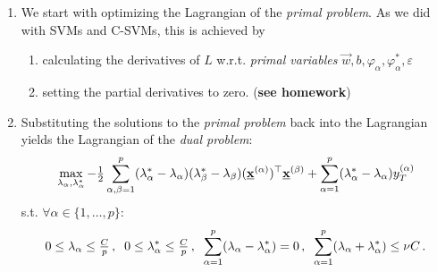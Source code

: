 \begin{frame}\frametitle{\subsecname}

\begin{enumerate}
\item We start with optimizing the Lagrangian of the \emph{primal problem}. As we did with SVMs and C-SVMs, this is achieved by
\begin{enumerate}
\item calculating the derivatives of $L$ w.r.t. \emph{primal variables} $\vec w, b, \varphi_\alpha, \varphi_\alpha^*, \varepsilon$
\item setting the partial derivatives to zero. (\textbf{see homework})
\end{enumerate}

\item Substituting the solutions to the \emph{primal problem} back into the Lagrangian yields the Lagrangian of the \emph{dual problem}:
		\begin{equation}
		  \max_{\lambda_{\alpha}, \lambda_{\alpha}^*}
		  - {\textstyle \frac{1}{2}}\sum_{\alpha,\beta=1}^p(\lambda_{\alpha}^* -
		  \lambda_{\alpha}) (\lambda_{\beta}^* - \lambda_{\beta})
		  (\underline{\mathbf{x}}^{(\alpha)})^\top\underline{\mathbf{x}}^{(\beta)} +
		  \sum_{\alpha=1}^p(\lambda_{\alpha}^* 
		  - \lambda_{\alpha})y_T^{(\alpha)}
		  \nonumber
		\end{equation}
		s.t. $\forall \alpha \in \{1,\ldots,p\}$:
		$$
		  0 \leq \lambda_{\alpha} \leq {\textstyle \frac{C}{p}}
		  \,, \;\;
		  0 \leq \lambda_{\alpha}^* \leq {\textstyle \frac{C}{p}}
		  \,, \;\;
		  \sum_{\alpha=1}^p(\lambda_{\alpha} - \lambda_{\alpha}^*) = 0 
		  \,, \;\;
		  \sum_{\alpha=1}^p(\lambda_{\alpha} + \lambda_{\alpha}^*) 
		  \leq  \nu C \,.  \nonumber
		$$
\end{enumerate}


\end{frame}


